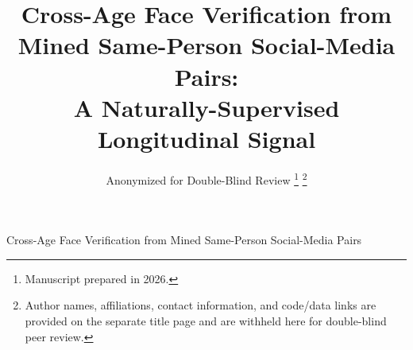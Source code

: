 \documentclass[journal]{IEEEtran}
\begin{document}
\title{Cross-Age Face Verification from Mined Same-Person Social-Media Pairs:\\ A Naturally-Supervised Longitudinal Signal}

\author{Anonymized for Double-Blind Review
\thanks{Manuscript prepared in 2026.}
\thanks{Author names, affiliations, contact information, and code/data links are provided on the separate title page and are withheld here for double-blind peer review.}}

{Cross-Age Face Verification from Mined Same-Person Social-Media Pairs}

\maketitle
\end{document}
